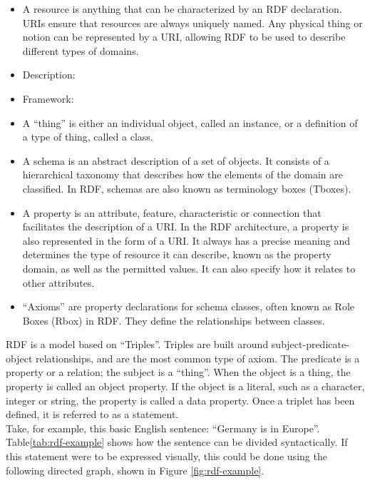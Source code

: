     \begin{itemize}
        \item A resource is anything that can be characterized by an RDF declaration. URIs ensure that resources are always uniquely named. Any physical thing or notion can be represented by a URI, allowing RDF to be used to describe different types of domains.
        \item Description:
        \item Framework:
        \item A “thing” is either an individual object, called an instance, or a definition of a type of thing, called a class. 
        \item A schema is an abstract description of a set of objects. It consists of a hierarchical taxonomy that describes how the elements of the domain are classified. In RDF, schemas are also known as terminology boxes (Tboxes). 
        \item A property is an attribute, feature, characteristic or connection that facilitates the description of a URI. In the RDF architecture, a property is also represented in the form of a URI. It always has a precise meaning and determines the type of resource it can describe, known as the property domain, as well as the permitted values. It can also specify how it relates to other attributes. 
        \item “Axioms” are property declarations for schema classes, often known as Role Boxes (Rbox) in RDF. They define the relationships between classes.
    \end{itemize}

    RDF is a model based on “Triples”. Triples are built around subject-predicate-object relationships, and are the most common type of axiom. The predicate is a property or a relation; the subject is a “thing”. When the object is a thing, the property is called an object property. If the object is a literal, such as a character, integer or string, the property is called a data property. Once a triplet has been defined, it is referred to as a statement.\\

    Take, for example, this basic English sentence: “Germany is in Europe”. Table\ref{tab:rdf-example} shows how the sentence can be divided syntactically. If this statement were to be expressed visually, this could be done using the following directed graph, shown in Figure \ref{fig:rdf-example}.\\
    
